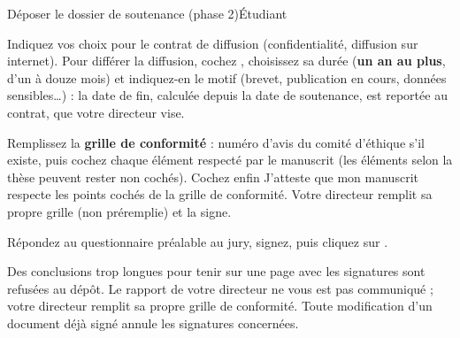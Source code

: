 \documentclass[11pt,a4paper]{article}
\begin{document}
\begin{procedure}{Déposer le dossier de soutenance (phase 2)}{Étudiant}
\begin{etapes}
  \item Indiquez vos choix pour le contrat de diffusion (confidentialité,
        diffusion sur internet). Pour différer la diffusion, cochez
        ,
        choisissez sa durée (\textbf{un an au plus}, d'un à douze mois) et
        indiquez-en le motif (brevet, publication en cours, données
        sensibles\ldots) : la date de fin, calculée depuis la date de
        soutenance, est reportée au contrat, que votre directeur vise.
  \item Remplissez la \textbf{grille de conformité} : numéro d'avis du comité
        d'éthique s'il existe, puis cochez chaque élément respecté par le
        manuscrit (les éléments \og selon la thèse\fg{} peuvent rester non
        cochés). Cochez enfin \og J'atteste que mon manuscrit respecte les points
        cochés de la grille de conformité\fg{}. Votre directeur remplit sa
        propre grille (non préremplie) et la signe.
  \item Répondez au questionnaire préalable au jury, signez, puis cliquez sur
        .
\end{etapes}
\end{procedure}







\begin{attention}
Des conclusions trop longues pour tenir sur une page avec les signatures sont
refusées au dépôt. Le rapport de votre directeur ne vous est pas communiqué ;
votre directeur remplit sa propre grille de conformité. Toute modification d'un document déjà signé annule
les signatures concernées.
\end{attention}
\end{document}
